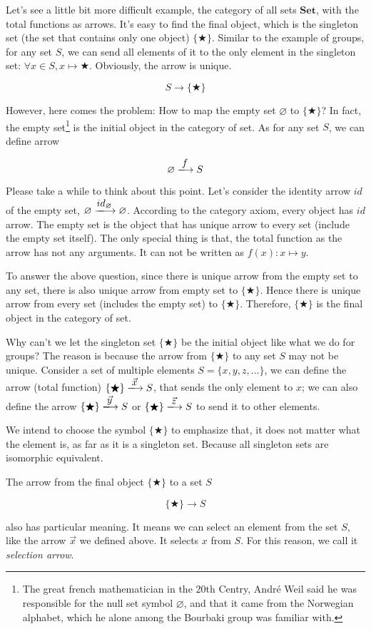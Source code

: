 \documentclass{article}
\begin{document}
\begin{example}
\normalfont
Let's see a little bit more difficult example, the category of all sets $\pmb{Set}$, with the total functions as arrows. It's easy to find the final object, which is the singleton set (the set that contains only one object) $\{ \bigstar \}$. Similar to the example of groups, for any set $S$, we can send all elements of it to the only element in the singleton set: $\forall x \in S, x \mapsto \bigstar$. Obviously, the arrow is unique.

\[
  S \longrightarrow \{ \bigstar \}
\]

However, here comes the problem: How to map the empty set $\varnothing$ to $\{ \bigstar \}$? In fact, the empty set\footnote{The great french mathematician in the 20th Centry, André Weil said he was responsible for the null set symbol $\varnothing$, and that it came from the Norwegian alphabet, which he alone among the Bourbaki group was familiar with.} is the initial object in the category of set. As for any set $S$, we can define arrow

\[
  \varnothing \arrowto{f} S
\]

Please take a while to think about this point. Let's consider the identity arrow $id$ of the empty set, $\varnothing \arrowto{id_{\varnothing}} \varnothing$. According to the category axiom, every object has $id$ arrow. The empty set is the object that has unique arrow to every set (include the empty set itself). The only special thing is that, the total function as the arrow has not any arguments. It can not be written as $f(x): x \mapsto y$.

To answer the above question, since there is unique arrow from the empty set to any set, there is also unique arrow from empty set to $\{ \bigstar \}$. Hence there is unique arrow from every set (includes the empty set) to $\{ \bigstar \}$. Therefore, $\{ \bigstar \}$ is the final object in the category of set.

Why can't we let the singleton set $\{ \bigstar \}$ be the initial object like what we do for groups? The reason is because the arrow from $\{ \bigstar \}$ to any set $S$ may not be unique. Consider a set of multiple elements $S = \{x, y, z, ...\}$, we can define the arrow (total function) $\{ \bigstar \} \arrowto{\vec{x}} S$, that sends the only element to $x$; we can also define the arrow $\{ \bigstar \} \arrowto{\vec{y}} S$ or $\{ \bigstar \} \arrowto{\vec{z}} S$ to send it to other elements.

We intend to choose the symbol $\{ \bigstar \}$ to emphasize that, it does not matter what the element is, as far as it is a singleton set. Because all singleton sets are isomorphic equivalent.

\label{sec:selection-arrow} 
The arrow from the final object $\{ \bigstar \}$ to a set $S$

\[
  \{ \bigstar \} \longrightarrow S
\]

also has particular meaning. It means we can select an element from the set $S$, like the arrow $\vec{x}$ we defined above. It selects $x$ from $S$. For this reason, we call it {\em selection arrow}.
\end{example}
\end{document}

